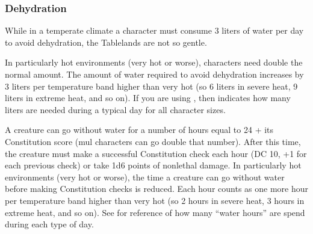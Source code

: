 \subsubsection{Dehydration}
While in a temperate climate a character must consume 3 liters of water per day to avoid dehydration, the Tablelands are not so gentle.

In particularly hot environments (very hot or worse), characters need double the normal amount. The amount of water required to avoid dehydration increases by 3 liters per temperature band higher than very hot (so 6 liters in severe heat, 9 liters in extreme heat, and so on). If you are using , then  indicates how many liters are needed during a typical day for all character sizes.


A creature can go without water for a number of hours equal to 24 + its Constitution score (mul characters can go double that number). After this time, the creature must make a successful Constitution check each hour (DC 10, +1 for each previous check) or take 1d6 points of nonlethal damage. In particularly hot environments (very hot or worse), the time a creature can go without water before making Constitution checks is reduced. Each hour counts as one more hour per temperature band higher than very hot (so 2 hours in severe heat, 3 hours in extreme heat, and so on). See  for reference of how many ``water hours'' are spend during each type of day. 



